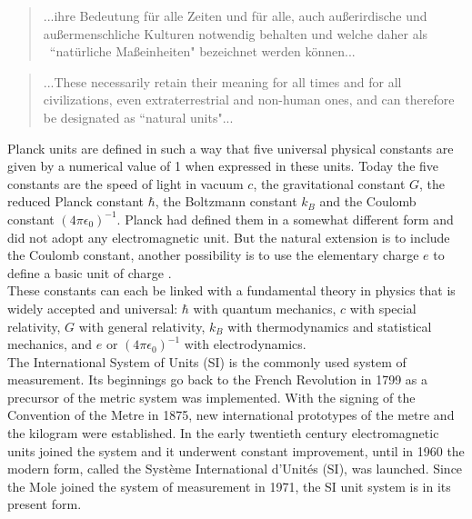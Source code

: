 \documentclass[prb,preprint]{revtex4-1}
\begin{document}
\begin{quote} ...ihre Bedeutung f\"{u}r alle Zeiten und f\"{u}r alle, auch au{\ss}erirdische und au{\ss}ermenschliche Kulturen notwendig behalten und welche daher als  ``nat\"{u}rliche Ma{\ss}einheiten" bezeichnet werden k\"{o}nnen... \end{quote}

\begin{quote} ...These necessarily retain their meaning for all times and for all civilizations, even extraterrestrial and non-human ones, and can therefore be designated as ``natural units"... \end{quote}

Planck units are defined in such a way that five universal physical constants are given by a numerical value of 1 when expressed in these units. Today the five constants are the speed of light in vacuum $c$, the gravitational constant $G$, the reduced Planck constant $\hbar$, the Boltzmann constant $k_B$ and the Coulomb constant $\left(4 \pi \epsilon_0\right)^{-1}$. Planck had defined them in a somewhat different form and did not adopt any electromagnetic unit. But the natural extension is to include the Coulomb constant, another possibility is to use the elementary charge $e$ to define a basic unit of charge \cite{Tomilin99}.\\
These constants can each be linked with a fundamental theory in physics that is widely accepted and universal: $\hbar$ with quantum mechanics, $c$ with special relativity, $G$ with general relativity, $k_B$ with thermodynamics and statistical mechanics, and $e$ or $\left(4 \pi \epsilon_0\right)^{-1}$ with electrodynamics.\\


The International System of Units (SI) is the commonly used system of measurement. Its beginnings go back to the French Revolution in 1799 as a precursor of the metric system was implemented. With the signing of the Convention of the Metre in 1875, new international prototypes of the metre and the kilogram were established. In the early twentieth century electromagnetic units joined the system and it underwent constant improvement, until in 1960 the modern form, called the Système International d'Unités (SI), was launched. Since the Mole joined the system of measurement in 1971, the SI unit system is in its present form.\\
\end{document}
